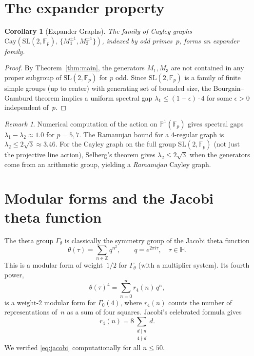 \documentclass[12pt]{amsart}
\newtheorem{corollary}[theorem]{Corollary}
\theoremstyle{definition}
\theoremstyle{remark}
\newtheorem{remark}[theorem]{Remark}
\newcommand{\SL}{\mathrm{SL}}
\newcommand{\Fp}{\mathbb{F}_p}
\newcommand{\Z}{\mathbb{Z}}
\newcommand{\HH}{\mathbb{H}}
\begin{document}
\section{The expander property}\label{sec:expander}

\begin{corollary}[Expander Graphs]\label{cor:expander}
The family of Cayley graphs
$\mathrm{Cay}(\SL(2,\Fp),\, \{M_1^{\pm1}, M_3^{\pm1}\})$,
indexed by odd primes~$p$, forms an expander family.
\end{corollary}

\begin{proof}
By Theorem~\ref{thm:main}, the generators $M_1, M_3$ are not
contained in any proper subgroup of $\SL(2,\Fp)$ for $p$ odd.
Since $\SL(2,\Fp)$ is a family of finite simple groups (up to center)
with generating set of bounded size, the Bourgain--Gamburd theorem
\cite{bourgain-gamburd} implies a uniform spectral gap $\lambda_1 \le
(1-\epsilon) \cdot 4$ for some $\epsilon > 0$ independent of~$p$.
\end{proof}

\begin{remark}
Numerical computation of the action on $\mathbb{P}^1(\Fp)$ gives
spectral gaps $\lambda_1 - \lambda_2 \approx 1.0$ for $p = 5, 7$.
The Ramanujan bound for a 4-regular graph is $\lambda_2 \le 2\sqrt{3}
\approx 3.46$.  For the Cayley graph on the full group $\SL(2,\Fp)$
(not just the projective line action), Selberg's theorem gives
$\lambda_2 \le 2\sqrt{3}$ when the generators come from an arithmetic
group, yielding a \emph{Ramanujan} Cayley graph.
\end{remark}

\section{Modular forms and the Jacobi theta function}\label{sec:modular}

The theta group $\Gamma_\theta$ is classically the symmetry group of the
Jacobi theta function
\begin{equation}\label{eq:theta}
\theta(\tau) = \sum_{n \in \Z} q^{n^2}, \qquad q = e^{2\pi i \tau},
\quad \tau \in \HH.
\end{equation}
This is a modular form of weight~$1/2$ for $\Gamma_\theta$ (with a
multiplier system).  Its fourth power,
\[
\theta(\tau)^4 = \sum_{n=0}^{\infty} r_4(n)\, q^n,
\]
is a weight-2 modular form for $\Gamma_0(4)$, where $r_4(n)$ counts
the number of representations of~$n$ as a sum of four squares.
Jacobi's celebrated formula gives
\begin{equation}\label{eq:jacobi}
r_4(n) = 8 \sum_{\substack{d \mid n \\ 4 \nmid d}} d.
\end{equation}
We verified \eqref{eq:jacobi} computationally for all $n \le 50$.
\end{document}

